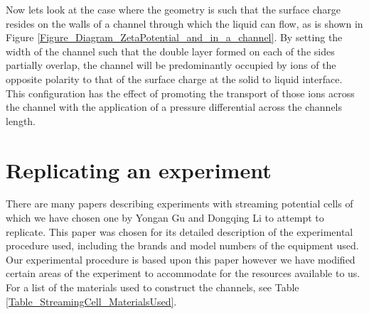 


Now lets look at the case where the geometry is such that the surface charge
resides on the walls of a channel through which the liquid can flow, as is
shown in Figure \ref{Figure_Diagram_ZetaPotential_and_in_a_channel}.  By
setting the width of the channel such that the double layer formed on each of
the sides partially overlap, the channel will be predominantly occupied by ions
of the opposite polarity to that of the surface charge at the solid to liquid
interface. This configuration has the effect of promoting the transport of
those ions across the channel with the application of a pressure differential
across the channels length.




\section{Replicating an experiment}

There are many papers describing experiments with streaming potential cells
\cite{Gu2000,Mala1997,Scales1992,VanderHeyden2006} of which we have chosen one
by Yongan Gu and Dongqing Li \cite{Gu2000} to attempt to replicate. This paper
was chosen for its detailed description of the experimental procedure used,
including the brands and model numbers of the equipment used. Our experimental
procedure is based upon this paper however we have modified certain areas of
the experiment to accommodate for the resources available to us. For a list of
the materials used to construct the channels, see Table
\ref{Table_StreamingCell_MaterialsUsed}.


